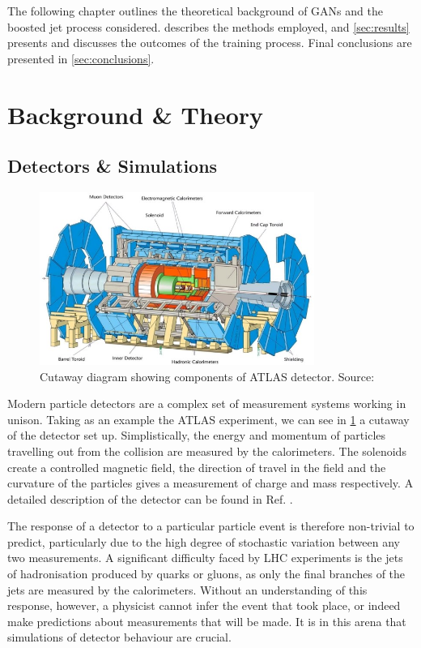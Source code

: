 \documentclass[twocolumn]{article}
\begin{document}
The following chapter outlines the theoretical background of GANs and the boosted jet process considered.  describes the methods employed, and \cref{sec:results} presents and discusses the outcomes of the training process. Final conclusions are presented in \cref{sec:conclusions}.
\vfill
\section{Background \& Theory}
\label{sec:theory}


\subsection{Detectors \& Simulations}
\label{sec:detector}

\begin{figure}[!htbp]
	\centering
	\includegraphics[width=0.8\textwidth]{atlasdetector}
	
	\caption{Cutaway diagram showing components of ATLAS detector. Source: \cite{atlaspic}}
	\label{fig:atlaspic}
	
\end{figure}


Modern particle detectors are a complex set of measurement systems working in unison. Taking as an example the ATLAS experiment, we can see in \cref{fig:atlaspic} a cutaway of the detector set up. Simplistically, the energy and momentum of particles travelling out from the collision are measured by the calorimeters. The solenoids create a controlled magnetic field, the direction of travel in the field and the curvature of the particles gives a measurement of charge and mass respectively. A detailed description of the detector can be found in Ref. \cite{armstrong}.

The response of a detector to a particular particle event is therefore non-trivial to predict, particularly due to the high degree of stochastic variation between any two measurements. A significant difficulty faced by LHC experiments is the jets of hadronisation produced by quarks or gluons, as only the final branches of the jets are measured by the calorimeters. Without an understanding of this response, however, a physicist cannot infer the event that took place, or indeed make predictions about measurements that will be made. It is in this arena that simulations of detector behaviour are crucial. 
\end{document}
